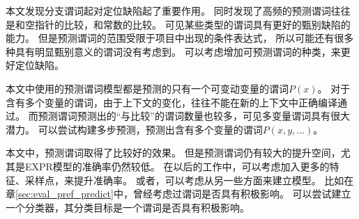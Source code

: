 本文发现分支谓词起对定位缺陷起了重要作用。
同时发现了高频的预测谓词往往是和空指针的比较，和常数的比较。
可见某些类型的谓词具有更好的甄别缺陷的能力。
但是预测谓词的范围受限于项目中出现的条件表达式，
所以可能还有很多种具有明显甄别意义的谓词没有考虑到。
可以考虑增加可预测谓词的种类，来更好定位缺陷。

本文中使用的预测谓词模型都是预测的只有一个可变动变量的谓词$P(x)$。
对于含有多个变量的谓词，由于上下文的变化，往往不能在新的上下文中正确编译通过。
而预测谓词预测出的“与比较”的谓词数量也较多，可见多变量谓词具有很大潜力。
可以尝试构建多步预测，预测出含有多个变量的谓词$P(x,y,...)$。

本文中，预测谓词取得了比较好的效果。
但是预测谓词仍有较大的提升空间，尤其是EXPR模型的准确率仍然较低。
在以后的工作中，可以考虑加入更多的特征、采样点，来提升准确率。
或者，可以考虑从另一些方面来建立模型。
比如在章\ref{sec:eval_pref_predict}中，曾经考虑过谓词是否具有积极影响。
可以尝试建立一个分类器，其分类目标是一个谓词是否具有积极影响。
